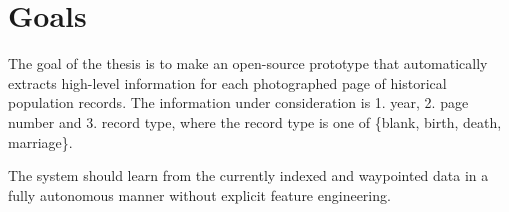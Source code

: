 \section{Goals}

The goal of the thesis is to make an open-source prototype that automatically extracts high-level information for each photographed page of historical population records. The information under consideration is 1. year, 2. page number and 3. record type, where the record type is one of \{blank, birth, death, marriage\}.

The system should learn from the currently indexed and waypointed data in a fully autonomous manner without explicit feature engineering.


